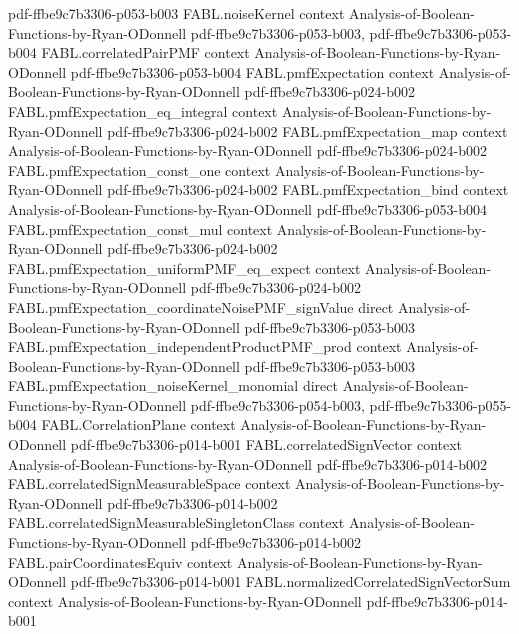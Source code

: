 \begin{theorem}
  {pdf-ffbe9c7b3306-p053-b003}
\proofstep
  {FABL.noiseKernel}
  {context}
  {Analysis-of-Boolean-Functions-by-Ryan-ODonnell}
  {pdf-ffbe9c7b3306-p053-b003,
    pdf-ffbe9c7b3306-p053-b004}
\proofstep
  {FABL.correlatedPairPMF}
  {context}
  {Analysis-of-Boolean-Functions-by-Ryan-ODonnell}
  {pdf-ffbe9c7b3306-p053-b004}
\proofstep
  {FABL.pmfExpectation}
  {context}
  {Analysis-of-Boolean-Functions-by-Ryan-ODonnell}
  {pdf-ffbe9c7b3306-p024-b002}
\proofstep
  {FABL.pmfExpectation_eq_integral}
  {context}
  {Analysis-of-Boolean-Functions-by-Ryan-ODonnell}
  {pdf-ffbe9c7b3306-p024-b002}
\proofstep
  {FABL.pmfExpectation_map}
  {context}
  {Analysis-of-Boolean-Functions-by-Ryan-ODonnell}
  {pdf-ffbe9c7b3306-p024-b002}
\proofstep
  {FABL.pmfExpectation_const_one}
  {context}
  {Analysis-of-Boolean-Functions-by-Ryan-ODonnell}
  {pdf-ffbe9c7b3306-p024-b002}
\proofstep
  {FABL.pmfExpectation_bind}
  {context}
  {Analysis-of-Boolean-Functions-by-Ryan-ODonnell}
  {pdf-ffbe9c7b3306-p053-b004}
\proofstep
  {FABL.pmfExpectation_const_mul}
  {context}
  {Analysis-of-Boolean-Functions-by-Ryan-ODonnell}
  {pdf-ffbe9c7b3306-p024-b002}
\proofstep
  {FABL.pmfExpectation_uniformPMF_eq_expect}
  {context}
  {Analysis-of-Boolean-Functions-by-Ryan-ODonnell}
  {pdf-ffbe9c7b3306-p024-b002}
\proofstep
  {FABL.pmfExpectation_coordinateNoisePMF_signValue}
  {direct}
  {Analysis-of-Boolean-Functions-by-Ryan-ODonnell}
  {pdf-ffbe9c7b3306-p053-b003}
\proofstep
  {FABL.pmfExpectation_independentProductPMF_prod}
  {context}
  {Analysis-of-Boolean-Functions-by-Ryan-ODonnell}
  {pdf-ffbe9c7b3306-p053-b003}
\proofstep
  {FABL.pmfExpectation_noiseKernel_monomial}
  {direct}
  {Analysis-of-Boolean-Functions-by-Ryan-ODonnell}
  {pdf-ffbe9c7b3306-p054-b003,
    pdf-ffbe9c7b3306-p055-b004}
\proofstep
  {FABL.CorrelationPlane}
  {context}
  {Analysis-of-Boolean-Functions-by-Ryan-ODonnell}
  {pdf-ffbe9c7b3306-p014-b001}
\proofstep
  {FABL.correlatedSignVector}
  {context}
  {Analysis-of-Boolean-Functions-by-Ryan-ODonnell}
  {pdf-ffbe9c7b3306-p014-b002}
\proofstep
  {FABL.correlatedSignMeasurableSpace}
  {context}
  {Analysis-of-Boolean-Functions-by-Ryan-ODonnell}
  {pdf-ffbe9c7b3306-p014-b002}
\proofstep
  {FABL.correlatedSignMeasurableSingletonClass}
  {context}
  {Analysis-of-Boolean-Functions-by-Ryan-ODonnell}
  {pdf-ffbe9c7b3306-p014-b002}
\proofstep
  {FABL.pairCoordinatesEquiv}
  {context}
  {Analysis-of-Boolean-Functions-by-Ryan-ODonnell}
  {pdf-ffbe9c7b3306-p014-b001}
\proofstep
  {FABL.normalizedCorrelatedSignVectorSum}
  {context}
  {Analysis-of-Boolean-Functions-by-Ryan-ODonnell}
  {pdf-ffbe9c7b3306-p014-b001}

\end{theorem}
